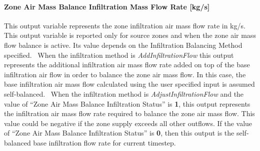 \paragraph{Zone Air Mass Balance Infiltration Mass Flow Rate {[}kg/s{]}}\label{zone-air-mass-balance-infiltration-mass-flow-rate-kgs}

This output variable represents the zone infiltration air mass flow rate in kg/s.~ This output variable is reported only for source zones and when the zone air mass flow balance is active. Its value depends on the Infiltration Balancing Method specified.~ When the infiltration method is \emph{AddInfiltrationFlow} this output represents the additional infiltration air mass flow rate added on top of the base infiltration air flow in order to balance the zone air mass flow. In this case, the base infiltration air mass flow calculated using the user specified input is assumed self-balanced.~ When the infiltration method is \emph{AdjustInfiltrationFlow} and the value of ``Zone Air Mass Balance Infiltration Status'' is \textbf{1}, this output represents the infiltration air mass flow rate required to balance the zone air mass flow. This value could be negative if the zone supply exceeds all other outflows. If the value of ``Zone Air Mass Balance Infiltration Status'' is \textbf{0}, then this output is the self-balanced base infiltration flow rate for current timestep.
